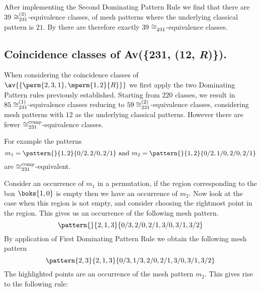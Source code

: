 After implementing the Second Dominating Pattern Rule we find that there are
\(39\) \(\coinc[(2)]{231}\)-equivalence classes, of mesh patterns where the
underlying classical pattern is \(21\). By  there are
therefore exactly \(39\) \(\coinc{231}\)-equivalence classes.

\subsection{Coincidence classes of Av(\{231, (12, \textit{R})\}).}
When considering the coincidence classes of
\(\av{\{\perm{2,3,1},\mperm{1,2}{R}\}}\) we first apply the two Dominating
Pattern rules previously established. Starting from \(220\) classes, we result
in \(85 \coinc[(1)]{231}\)-equivalence classes reducing to \(59
\coinc[(2)]{231}\)-equivalence classes, considering mesh patterns with \(12\) as
the underlying classical patterns. However there are fewer
\(\coinc[comp]{231}\)-equivalence classes.

For example the patterns
\begin{equation*}
    m_1 = \pattern{}{1,2}{0/2,2/0,2/1} \text{ and } m_2 = \pattern{}{1,2}{0/2,1/0,2/0,2/1}
\end{equation*}
are \(\coinc[comp]{231}\)-equivalent.

Consider an occurrence of \(m_1\) in a permutation, if the region corresponding
to the box \(\boks{1,0}\) is empty then we have an occurrence of \(m_2\). Now
look at the case when this region is not empty, and consider choosing the
rightmost point in the region. This gives us an occurrence of the following mesh
pattern.
\begin{equation*}
    \pattern{}{2,1,3}{0/3,2/0,2/1,3/0,3/1,3/2}
\end{equation*}
By application of First Dominating Pattern Rule we obtain the following mesh
pattern
\begin{equation*}
    \pattern{2,3}{2,1,3}{0/3,1/3,2/0,2/1,3/0,3/1,3/2}
\end{equation*}
The highlighted points are an occurrence of the mesh pattern \(m_2\). This gives
rise to the following rule:

